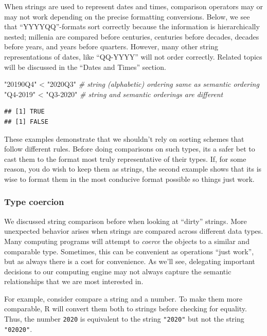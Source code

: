 \documentclass[
]{krantz}
\makeatletter
\newenvironment{Shaded}{\begin{snugshade}}{\end{snugshade}}
\newcommand{\CommentTok}[1]{\textcolor[rgb]{0.37,0.37,0.37}{\textit{#1}}}
\newcommand{\SpecialCharTok}[1]{\textcolor[rgb]{0,0,0}{#1}}
\newcommand{\StringTok}[1]{\textcolor[rgb]{0.5,0.5,0.5}{#1}}
\newenvironment{kframe}{%
\medskip{}
\setlength{\fboxsep}{.8em}
 \def\at@end@of@kframe{}%
 \ifinner\ifhmode%
  \def\at@end@of@kframe{\end{minipage}}%
  \begin{minipage}{\columnwidth}%
 \fi\fi%
 \def\FrameCommand##1{\hskip\@totalleftmargin \hskip-\fboxsep
 \colorbox{shadecolor}{##1}\hskip-\fboxsep
     \hskip-\linewidth \hskip-\@totalleftmargin \hskip\columnwidth}%
 \MakeFramed {\advance\hsize-\width
   \@totalleftmargin\z@ \linewidth\hsize
   \@setminipage}}%
 {\par\unskip\endMakeFramed%
 \at@end@of@kframe}
\renewenvironment{Shaded}{\begin{kframe}}{\end{kframe}}
\makeatother
\begin{document}
When strings are used to represent dates and times, comparison operators may or may not work depending on the precise formatting conversions. Below, we see that ``YYYYQQ''-formats sort correctly because the information is hierarchically nested; millenia are compared before centuries, centuries before decades, decades before years, and years before quarters. However, many other string representations of dates, like ``QQ-YYYY'' will not order correctly. Related topics will be discussed in the ``Dates and Times'' section.

\begin{Shaded}
\begin{Highlighting}[]
\StringTok{"20190Q4"} \SpecialCharTok{\textless{}} \StringTok{"2020Q3"} \CommentTok{\# string (alphabetic) ordering same as semantic ordering}
\StringTok{"Q4{-}2019"} \SpecialCharTok{\textless{}} \StringTok{"Q3{-}2020"} \CommentTok{\# string and semantic orderings are different}
\end{Highlighting}
\end{Shaded}

\begin{verbatim}
## [1] TRUE
## [1] FALSE
\end{verbatim}

These examples demonstrate that we shouldn't rely on sorting schemes that follow different rules. Before doing comparisons on such types, its a safer bet to cast them to the format most truly representative of their types. If, for some reason, you do wish to keep them as strings, the second example shows that its is wise to format them in the most conducive format possible so things just work.

\hypertarget{type-coercion}{%
\subsubsection{Type coercion}\label{type-coercion}}

We discussed string comparison before when looking at ``dirty'' strings. More unexpected behavior arises when strings are compared across different data types. Many computing programs will attempt to \emph{coerce} the objects to a similar and comparable type. Sometimes, this can be convenient as operations ``just work'', but as always there is a cost for convenience. As we'll see, delegating important decisions to our computing engine may not always capture the semantic relationships that we are most interested in.

For example, consider compare a string and a number. To make them more comparable, R will convert them both to strings before checking for equality. Thus, the number \texttt{2020} is equivalent to the string \texttt{"2020"} but not the string \texttt{"02020"}.
\end{document}

